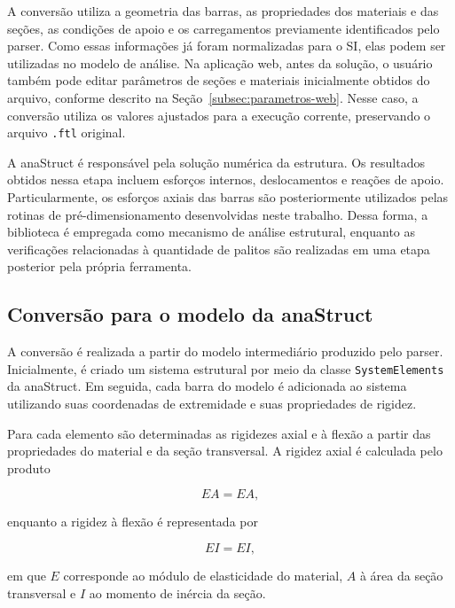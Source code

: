 A conversão utiliza a geometria das barras, as propriedades dos materiais e das seções, as condições de apoio e os carregamentos previamente identificados pelo parser. Como essas informações já foram normalizadas para o \gls{SI}, elas podem ser utilizadas no modelo de análise. Na aplicação web, antes da solução, o usuário também pode editar parâmetros de seções e materiais inicialmente obtidos do arquivo, conforme descrito na Seção~\ref{subsec:parametros-web}. Nesse caso, a conversão utiliza os valores ajustados para a execução corrente, preservando o arquivo \texttt{.ftl} original.

A anaStruct é responsável pela solução numérica da estrutura. Os resultados obtidos nessa etapa incluem esforços internos, deslocamentos e reações de apoio. Particularmente, os esforços axiais das barras são posteriormente utilizados pelas rotinas de pré-dimensionamento desenvolvidas neste trabalho. Dessa forma, a biblioteca é empregada como mecanismo de análise estrutural, enquanto as verificações relacionadas à quantidade de palitos são realizadas em uma etapa posterior pela própria ferramenta.

\subsection{Conversão para o modelo da anaStruct}
\label{subsec:conversao-anastruct}

A conversão é realizada a partir do modelo intermediário produzido pelo parser. Inicialmente, é criado um sistema estrutural por meio da classe \texttt{SystemElements} da anaStruct. Em seguida, cada barra do modelo é adicionada ao sistema utilizando suas coordenadas de extremidade e suas propriedades de rigidez.

Para cada elemento são determinadas as rigidezes axial e à flexão a partir das propriedades do material e da seção transversal. A rigidez axial é calculada pelo produto

\begin{equation}
    EA = E A,
\end{equation}

enquanto a rigidez à flexão é representada por

\begin{equation}
    EI = E I,
\end{equation}

em que \(E\) corresponde ao módulo de elasticidade do material, \(A\) à área da seção transversal e \(I\) ao momento de inércia da seção.


